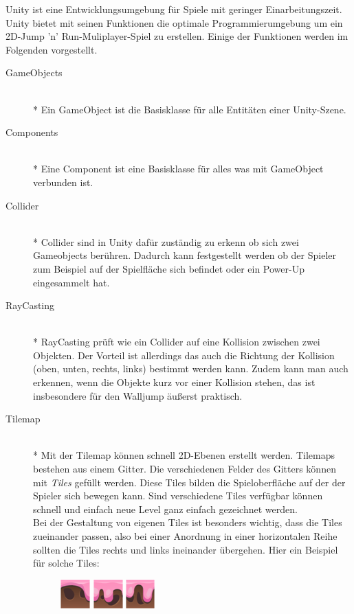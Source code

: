 Unity ist eine Entwicklungsumgebung für Spiele mit geringer Einarbeitungszeit. Unity bietet mit seinen Funktionen die optimale Programmierumgebung um ein 2D-Jump 'n' Run-Muliplayer-Spiel zu erstellen. Einige der Funktionen werden im Folgenden vorgestellt.

\begin{description}
    \item[GameObjects] \hfill \\* Ein GameObject ist die Basisklasse für alle Entitäten einer Unity-Szene.
    \item[Components] \hfill \\* Eine Component ist eine Basisklasse für alles was mit GameObject verbunden ist.
    \item[Collider] \hfill \\* Collider sind in Unity dafür zuständig zu erkenn ob sich zwei Gameobjects berühren. Dadurch kann festgestellt werden ob der Spieler zum Beispiel auf der Spielfläche sich befindet oder ein Power-Up eingesammelt hat.
    \item[RayCasting] \hfill \\*
        RayCasting prüft wie ein Collider auf eine Kollision zwischen zwei Objekten. Der Vorteil ist allerdings das auch die Richtung der Kollision (oben, unten, rechts, links) bestimmt werden kann. Zudem kann man auch erkennen, wenn die Objekte kurz vor einer Kollision stehen, das ist insbesondere für den Walljump äußerst praktisch.
    \item[Tilemap] \hfill \\* Mit der Tilemap können schnell 2D-Ebenen erstellt werden. Tilemaps bestehen aus einem Gitter. Die verschiedenen Felder des Gitters können mit \textit{Tiles} gefüllt werden. Diese Tiles bilden die Spieloberfläche auf der der Spieler sich bewegen kann. Sind verschiedene Tiles verfügbar können schnell und einfach neue Level ganz einfach gezeichnet werden. \\ 
        Bei der Gestaltung von eigenen Tiles ist besonders wichtig, dass die Tiles zueinander passen, also bei einer Anordnung in einer horizontalen Reihe sollten die Tiles rechts und links ineinander übergehen. Hier ein Beispiel für solche Tiles: 
        \begin{figure}[H]
            \begin{center}
              \includegraphics{img/realisierung/tile1.png}
              \includegraphics{img/realisierung/tile2.png}
              \includegraphics{img/realisierung/tile3.png}
              \label{fig:realisierung:realisierung:tiles}
            \end{center}
        \end{figure}
        

\end{description}
